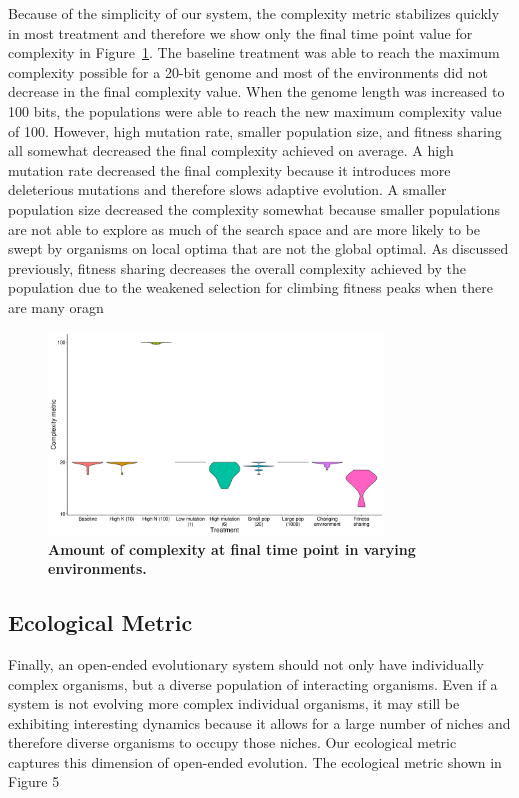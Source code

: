 \documentclass[letterpaper]{article}
\begin{document}
Because of the simplicity of our system, the complexity metric stabilizes quickly in most treatment and therefore we show only the final time point value for complexity in Figure~\ref{complexity}. The baseline treatment was able to reach the maximum complexity possible for a 20-bit genome and most of the environments did not decrease in the final complexity value. When the genome length was increased to 100 bits, the populations were able to reach the new maximum complexity value of 100. However, high mutation rate, smaller population size, and fitness sharing all somewhat decreased the final complexity achieved on average. A high mutation rate decreased the final complexity because it introduces more deleterious mutations and therefore slows adaptive evolution. A smaller population size decreased the complexity somewhat because smaller populations are not able to explore as much of the search space and are more likely to be swept by organisms on local optima that are not the global optimal. As discussed previously, fitness sharing decreases the overall complexity achieved by the population due to the weakened selection for climbing fitness peaks when there are many oragn

\begin{figure}
\includegraphics[width=3.5in]{figs/complexityboxplots.png}
\caption{\textbf{Amount of complexity at final time point in varying environments.} }
\label{complexity}
\end{figure}

\subsection{Ecological Metric}
Finally, an open-ended evolutionary system should not only have individually complex organisms, but a diverse population of interacting organisms. Even if a system is not evolving more complex individual organisms, it may still be exhibiting interesting dynamics because it allows for a large number of niches and therefore diverse organisms to occupy those niches. Our ecological metric captures this dimension of open-ended evolution. The ecological metric shown in Figure 5 
\end{document}
